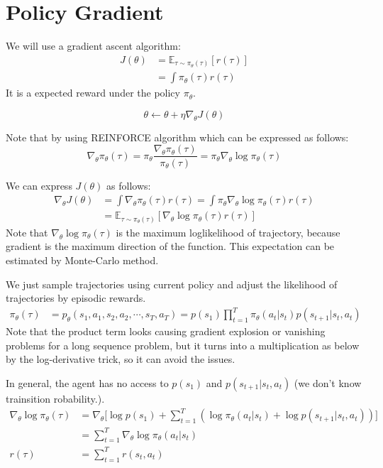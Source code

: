 \chapter{Policy Gradient}
We will use a gradient ascent algorithm:
\begin{align*}
	J(\theta) &=  \mathbb{E}_{\tau\sim \pi_\theta(\tau)}[r(\tau)]\\
	&= \int \pi_\theta(\tau) r(\tau)
	\label{eq:cost_fn}
\end{align*}
It is a expected reward under the policy $\pi_\theta$.

$$\theta \leftarrow \theta + \eta \nabla_\theta J(\theta)$$

Note that by using REINFORCE algorithm which can be expressed as follows:
$$\nabla_\theta \pi_\theta(\tau) = \pi_\theta \frac{\nabla_\theta \pi_\theta(\tau)}{\pi_\theta(\tau)} = \pi_\theta \nabla_\theta \log \pi_\theta(\tau)$$

We can express $J(\theta)$ as follows:
\begin{align*}
    \nabla_\theta J(\theta) &= \int \nabla_\theta\pi_\theta(\tau) r(\tau) = \int \pi_\theta \nabla_\theta \log \pi_\theta(\tau)r(\tau)\\
	&= \mathbb{E}_{\tau\sim \pi_\theta(\tau)}[\nabla_\theta \log \pi_\theta(\tau)r(\tau)] 
\end{align*}
Note that $\nabla_\theta \log \pi_\theta(\tau)$ is the maximum loglikelihood of trajectory, because gradient is the maximum direction of the function. This expectation can be estimated by Monte-Carlo method. 

We just sample trajectories using current policy and adjust the likelihood of trajectories by episodic rewards. 
\begin{align*}
	\pi_\theta(\tau) &=  p_\theta(s_1,a_1,s_2,a_2,\cdots,s_T,a_T) = p(s_1) \prod_{t=1}^{T}\pi_\theta(a_t|s_t)p(s_{t+1}|s_t,a_t)
\end{align*}
Note that the product term looks causing gradient explosion or vanishing problems for a long sequence problem, but it turns into a multiplication as below by the log-derivative trick, so it can avoid the issues. 

In general, the agent has no access to $p(s_1)$ and $p(s_{t+1}|s_t,a_t)$ (we don't know trainsition robability.).
\begin{align*}
	\nabla_\theta \log \pi_\theta(\tau) &= \nabla_\theta\Bigg[\log p(s_1) + \sum_{t=1}^{T}(\log \pi_\theta(a_t|s_t)+\log p(s_{t+1}|s_t,a_t))\Bigg]\\
	&= \sum_{t=1}^{T}\nabla_\theta\log \pi_\theta(a_t|s_t)\\
	r(\tau) &= \sum_{t=1}^{T}r(s_t,a_t)
\end{align*}

